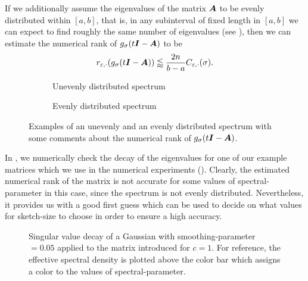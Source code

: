 If we additionally assume the eigenvalues of the matrix $\boldsymbol{A}$
to be evenly distributed within $[a, b]$, that is, in any subinterval of fixed length in
$[a, b]$ we can expect to find roughly the same number of eigenvalues (see ), then
we can estimate the numerical rank of $g_{\sigma}(t\boldsymbol{I} - \boldsymbol{A})$ to be
\begin{equation}
    r_{\varepsilon, \cdot}(g_{\sigma}(t\boldsymbol{I} - \boldsymbol{A})) \lessapprox \frac{2 n}{b - a} C_{\varepsilon, \cdot}(\sigma).
    \label{equ:3-nystrom-kernel-numerical-rank-even-eigenvalues}
\end{equation}

\begin{figure}[ht]
    \centering
    \begin{subfigure}[t]{0.45\columnwidth}
        
        \caption{Unevenly distributed spectrum}
    \end{subfigure}
    \begin{subfigure}[t]{0.45\columnwidth}
        
        \caption{Evenly distributed spectrum}
    \end{subfigure}      
    \caption{Examples of an unevenly and an evenly distributed spectrum
    with some comments about the numerical rank of $g_{\sigma}(t\boldsymbol{I} - \boldsymbol{A})$.}
    \label{fig:3-nystrom-evenly-distributed-spectrum}
\end{figure}

In , we numerically check the decay
of the eigenvalues for one of our example matrices which we use in the numerical
experiments (). Clearly, the estimated
numerical rank of the matrix is not accurate for some values of \gls{spectral-parameter}
in this case, since the spectrum is
not evenly distributed. Nevertheless, it provides us with a good first
guess which can be used to decide on what values for \gls{sketch-size} to choose
in order to ensure a high accuracy.\\
\begin{figure}[ht]
    \centering
    
    \caption{Singular value decay of a Gaussian 
       with \gls{smoothing-parameter} $=0.05$ applied to the matrix introduced
        for $c=1$. For reference,
       the effective spectral density is plotted above the color bar which
       assigns a color to the values of \gls{spectral-parameter}.}
    \label{fig:3-nystrom-singular-value-decay}
\end{figure}

